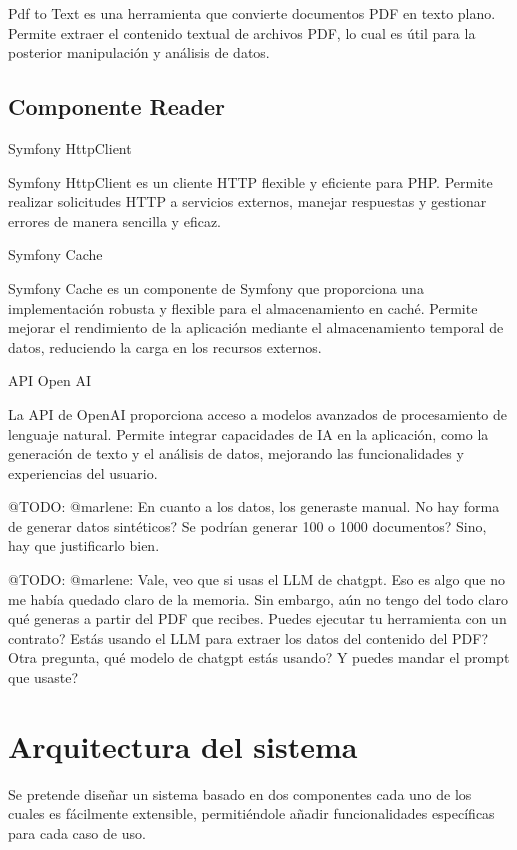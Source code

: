 Pdf to Text es una herramienta que convierte documentos PDF en texto plano.
Permite extraer el contenido textual de archivos PDF, lo cual es útil para la posterior manipulación y análisis de
datos.

\subsection{Componente Reader}

Symfony HttpClient

Symfony HttpClient es un cliente HTTP flexible y eficiente para PHP. Permite realizar solicitudes HTTP a servicios
externos, manejar respuestas y gestionar errores de manera sencilla y eficaz.

Symfony Cache

Symfony Cache es un componente de Symfony que proporciona una implementación robusta y flexible para el almacenamiento
en caché.
Permite mejorar el rendimiento de la aplicación mediante el almacenamiento temporal de datos, reduciendo la carga en los
recursos externos.

API Open AI

La API de OpenAI proporciona acceso a modelos avanzados de procesamiento de lenguaje natural.
Permite integrar capacidades de IA en la aplicación, como la generación de texto y el análisis de datos, mejorando las
funcionalidades y experiencias del usuario.


\colorbox{color_highlight}{@TODO: @marlene:}
En cuanto a los datos, los generaste manual. No hay forma de generar datos sintéticos? Se podrían generar 100 o 1000 documentos? Sino, hay que justificarlo bien.

\colorbox{color_highlight}{@TODO: @marlene:}
Vale, veo que si usas el LLM de chatgpt. Eso es algo que no me había quedado claro de la memoria. Sin embargo, aún no tengo del todo claro qué generas a partir del PDF que recibes. Puedes ejecutar tu herramienta con un contrato? Estás usando el LLM para extraer los datos del contenido del PDF? Otra pregunta, qué modelo de chatgpt estás usando? Y puedes mandar el prompt que usaste?


\section{Arquitectura del sistema}
Se pretende diseñar un sistema basado en dos componentes cada uno de los cuales es fácilmente extensible, permitiéndole añadir funcionalidades específicas para cada caso de uso.

